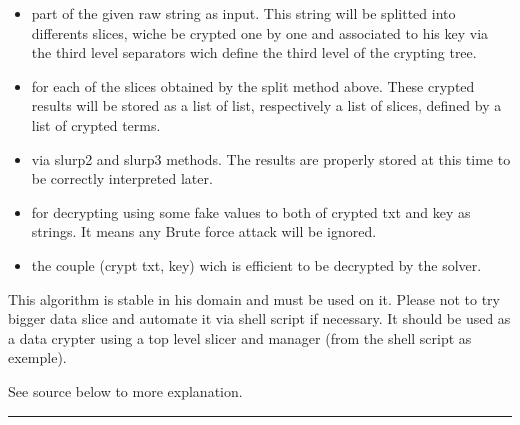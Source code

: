 \documentclass[letterpaper,10pt,english]{sphinxmanual}
\begin{document}
\begin{description}
\begin{itemize}
\item {} 
\sphinxAtStartPar
{} part of the given raw string as input. This string will be splitted into differents slices, wiche be crypted one by one and associated to his key via the third level separators wich define the third level of the crypting tree.

\item {} 
\sphinxAtStartPar
{} for each of the slices obtained by the split method above. These crypted results will be stored as a list of list, respectively a list of slices, defined by a list of crypted terms.

\item {} 
\sphinxAtStartPar
{} via slurp2 and slurp3 methods. The results are properly stored at this time to be correctly interpreted later.

\item {} 
\sphinxAtStartPar
{} for decrypting using some fake values to both of crypted txt and key as strings. It means any Brute force attack will be ignored.

\item {} 
\sphinxAtStartPar
{} the couple (crypt txt, key) wich is efficient to be decrypted by the solver.

\end{itemize}

\sphinxAtStartPar
This algorithm is stable in his domain and must be used on it.
Please not to try bigger data slice and automate it via shell script if necessary.
It should be used as a data crypter using a top level slicer and manager (from the shell script as exemple).

\sphinxAtStartPar
See source below to more explanation.

\end{description}


\bigskip\hrule\bigskip
\end{document}
